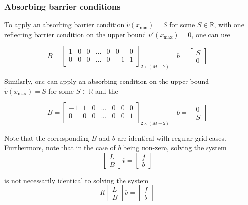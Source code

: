 \documentclass[11pt]{article}
\theoremstyle{definition}
\begin{document}
\subsubsection{Absorbing barrier conditions}

To apply an absorbing barrier condition $\tilde{v}(x_{\min}) =S$ for some $S \in \mathbb{R}$, with one reflecting barrier condition on the upper bound $v'(x_{\max}) = 0$, one can use

\begin{equation}\label{eq:absorbing-barrier-matrix}
B = \begin{bmatrix}
1 & 0 & 0 & \dots & 0 & 0 & 0 \\
0 & 0 & 0 & \dots & 0 & -1 & 1\\
\end{bmatrix}_{2 \times (M+2)} \quad
b = \begin{bmatrix}
S \\
0
\end{bmatrix}
\end{equation}

Similarly, one can apply an absorbing condition on the upper bound  $\tilde{v}(x_{\max}) =S$ for some $S \in \mathbb{R}$ and the


\begin{equation}\label{eq:absorbing-barrier-matrix-ub}
B = \begin{bmatrix}
-1 & 1 & 0 & \dots & 0 & 0 & 0 \\
0 & 0 & 0 & \dots & 0 & 0 & 1\\
\end{bmatrix}_{2 \times (M+2)} \quad
b = \begin{bmatrix}
0 \\
S
\end{bmatrix}
\end{equation}

Note that the corresponding $B$ and $b$ are identical with regular grid cases. Furthermore, note that in the case of $b$ being non-zero, solving the system 
\begin{equation}
\begin{bmatrix}
 L \\
 B
\end{bmatrix} 
\overline{v}
=
\begin{bmatrix}
f \\
b
\end{bmatrix}
\end{equation}

is not necessarily identical to solving the system
\begin{equation}
R \begin{bmatrix}
 L \\
 B
\end{bmatrix} 
\overline{v}
=
\begin{bmatrix}
f \\
b
\end{bmatrix}
\end{equation}
\end{document}

